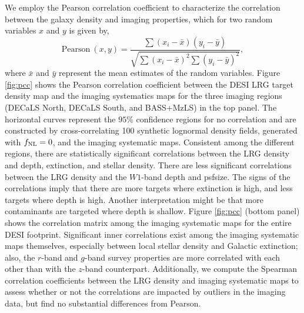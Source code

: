 We employ the Pearson correlation coefficient to characterize the correlation between the galaxy density and imaging properties, which for two random variables $x$ and $y$ is given by, 
\begin{equation}
	\text{Pearson}~(x, y) = \frac{\sum (x_{i}-\bar{x})(y_{i}-\bar{y})}{\sqrt{\sum (x_{i}-\bar{x})^{2}\sum (y_{i}-\bar{y})^{2}}},
\end{equation}
where $\bar{x}$ and $\bar{y}$ represent the mean estimates of the random variables. Figure \ref{fig:pcc} shows the Pearson correlation coefficient between the DESI LRG target density map and the imaging systematics maps for the three imaging regions (DECaLS North, DECaLS South, and BASS+MzLS) in the top panel. The horizontal curves represent the $95\%$ confidence regions for no correlation and are constructed by cross-correlating 100 synthetic lognormal density fields, generated with $f_{\rm NL}=0$, and the imaging systematic maps. Consistent among the different regions, there are statistically significant correlations between the LRG density and depth, extinction, and stellar density. There are less significant correlations between the LRG density and the $W1$-band depth and psfsize. The signs of the correlations imply that there are more targets where extinction is high, and less targets where depth is high. Another interpretation might be that more contaminants are targeted where depth is shallow. Figure \ref{fig:pcc} (bottom panel) shows the correlation matrix among the imaging systematic maps for the entire DESI footprint. Significant inner correlations exist among the imaging systematic maps themselves, especially between local stellar density and Galactic extinction; also, the $r$-band and $g$-band survey properties are more correlated with each other than with the $z$-band counterpart. Additionally, we compute the Spearman correlation coefficients between the LRG density and imaging systematic maps to assess whether or not the correlations are impacted by outliers in the imaging data, but find no substantial differences from Pearson.

